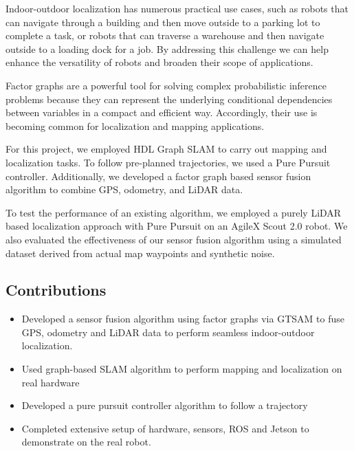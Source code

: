 \documentclass[10pt, reqno, letterpaper, twoside]{amsart}
\begin{document}
Indoor-outdoor localization has numerous practical use cases, such as robots that can navigate through a building and then move outside to a parking lot to complete a task, or robots that can traverse a warehouse and then navigate outside to a loading dock for a job. By addressing this challenge we can help enhance the versatility of robots and broaden their scope of applications.

Factor graphs are a powerful tool for solving complex probabilistic inference problems because they can represent the underlying conditional dependencies between variables in a compact and efficient way. Accordingly, their use is becoming common for localization and mapping applications.

For this project, we employed HDL Graph SLAM to carry out mapping and localization tasks. To follow pre-planned trajectories, we used a Pure Pursuit controller. Additionally, we developed a factor graph based sensor fusion algorithm to combine GPS, odometry, and LiDAR data.

To test the performance of an existing algorithm, we employed a purely LiDAR based localization approach with Pure Pursuit on an AgileX Scout 2.0 robot. We also evaluated the effectiveness of our sensor fusion algorithm using a simulated dataset derived from actual map waypoints and synthetic noise.


\subsection{Contributions}

\begin{itemize}
    \item Developed a sensor fusion algorithm using factor graphs via GTSAM to fuse GPS, odometry and LiDAR data to perform seamless indoor-outdoor localization.
    \item Used graph-based SLAM algorithm to perform mapping and localization on real hardware
    \item Developed a pure pursuit controller algorithm to follow a trajectory
    \item Completed extensive setup of hardware, sensors, ROS and Jetson to demonstrate on the real robot.

\end{itemize}

\end{document}
